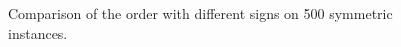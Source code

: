 \clearpage
\begin{figure}[!htbp]
 \hspace{1em}
 \vspace*{0.1cm}
 \caption{Comparison of the order with different signs on 500 symmetric instances.}
 \label{table:compare_sign_order}
\end{figure}


